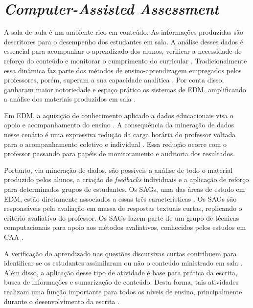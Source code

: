 \section{\textit{Computer-Assisted Assessment}}

A sala de aula é um ambiente rico em conteúdo. As informações produzidas são descritores para o desempenho dos estudantes em sala. A análise desses dados é essencial para acompanhar o aprendizado dos alunos, verificar a necessidade de reforço do conteúdo e monitorar o cumprimento do curricular \cite{sweta2021}. Tradicionalmente essa dinâmica faz parte dos métodos de ensino-aprendizagem empregados pelos professores, porém, superam a sua capacidade analítica \cite{madero2019}. Por conta disso, ganharam maior notoriedade e espaço prático os sistemas de EDM, amplificando a análise dos materiais produzidos em sala \cite{siemens2012, romero2010}.

Em EDM, a aquisição de conhecimento aplicado a dados educacionais visa o apoio e acompanhamento do ensino \cite{ferreira-mello2019}. A consequência da mineração de dados nesse cenário é uma expressiva redução da carga horária do professor voltada para o acompanhamento coletivo e individual \cite{sweta2021}. Essa redução ocorre com o professor passando para papéis de monitoramento e auditoria dos resultados.

Portanto, via mineração de dados, são possíveis a análise de todo o material produzido pelos alunos, a criação de \textit{feedbacks} individuais e a aplicação de reforço para determinados grupos de estudantes. Os SAGs, uma das áreas de estudo em EDM, estão diretamente associados a essas três características \cite{burrows2015}. Os SAGs são responsáveis pela avaliação em massa de respostas textuais curtas, replicando o critério avaliativo do professor. Os SAGs fazem parte de um grupo de técnicas computacionais para apoio aos métodos avaliativos, conhecidos pelos estudos em CAA \cite{perez-marin2009}.

A verificação do aprendizado nas questões discursivas curtas contribuem para identificar se os estudantes assimilaram ou não o conteúdo ministrado em sala \cite{oliveira2013}. Além disso, a aplicação desse tipo de atividade é base para prática da escrita, busca de informações e sumarização de conteúdo. Desta forma, tais atividades realizam uma função importante para todos os níveis de ensino, principalmente durante o desenvolvimento da escrita \cite{johnstone2002}. 

